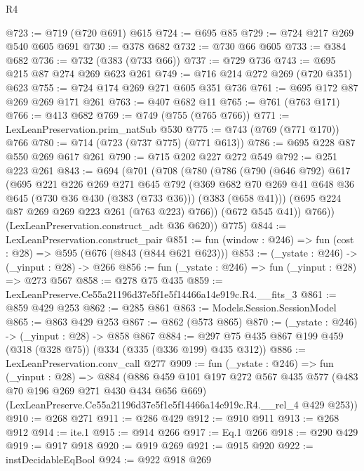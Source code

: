 \begin{lexlean}{R4}
\begin{coremodule}
@723 := @719 (@720 @691) @615
@724 := @695 @85
@729 := @724 @217 @269 @540 @605 @691
@730 := @378 @682
@732 := @730 @66 @605
@733 := @384 @682
@736 := @732 (@383 (@733 @66))
@737 := @729 @736
@743 := @695 @215 @87 @274 @269 @623 @261
@749 := @716 @214 @272 @269 (@720 @351) @623
@755 := @724 @174 @269 @271 @605 @351 @736
@761 := @695 @172 @87 @269 @269 @171 @261
@763 := @407 @682 @11
@765 := @761 (@763 @171)
@766 := @413 @682
@769 := @749 (@755 (@765 @766))
@771 := LexLeanPreservation.prim_natSub @530
@775 := @743 (@769 (@771 @170)) @766
@780 := @714 (@723 (@737 @775) (@771 @613))
@786 := @695 @228 @87 @550 @269 @617 @261
@790 := @715 @202 @227 @272 @549
@792 := @251 @223 @261
@843 := @694
    (@701
      (@708
        (@780
          (@786
            (@790
              (@646 @792)
              @617
              (@695
                @221
                @226
                @269
                @271
                @645
                @792
                (@369
                  @682
                  @70
                  @269
                  @41
                  @648
                  @36
                  @645
                  (@730 @36 @430 (@383 (@733 @36)))
                  (@383 (@658 @41)))
                (@695 @224 @87 @269 @269 @223 @261 (@763 @223) @766))
              (@672 @545 @41))
            @766))
        (LexLeanPreservation.construct_adt @36 @620))
      @775)
@844 := LexLeanPreservation.construct_pair
@851 := fun (window : @246) => fun (cost : @28) => @595 (@676 (@843 (@844 @621 @623)))
@853 := (_ystate : @246) -> (_yinput : @28) -> @266
@856 := fun (_ystate : @246) => fun (_yinput : @28) => @273 @567
@858 := @278 @75 @435
@859 := LexLeanPreserve.Ce55a21196d37e5f1e5f14466a14e919c.R4.__fits_3
@861 := @859 @429 @253
@862 := @285 @861
@863 := Models.Session.SessionModel
@865 := @863 @429 @253
@867 := @862 (@573 @865)
@870 := (_ystate : @246) -> (_yinput : @28) -> @858 @867
@884 := @297 @75 @435 @867 @199 @459 (@318 (@328 @75)) (@334 (@335 (@336 @199) @435 @312))
@886 := LexLeanPreservation.conv_call @277
@909 := fun (_ystate : @246) =>
  fun (_yinput : @28) =>
  @884
    (@886
      @459
      @101
      @197
      @272
      @567
      @435
      @577
      (@483 @70 @196 @269 @271 @430 @434 @656 @669)
      (LexLeanPreserve.Ce55a21196d37e5f1e5f14466a14e919c.R4.__rel_4 @429 @253))
@910 := @268 @271
@911 := @286 @429
@912 := @910 @911
@913 := @268 @912
@914 := ite.{1}
@915 := @914 @266
@917 := Eq.{1} @266
@918 := @290 @429
@919 := @917 @918
@920 := @919 @269
@921 := @915 @920
@922 := instDecidableEqBool
@924 := @922 @918 @269

\end{coremodule}
\end{lexlean}
